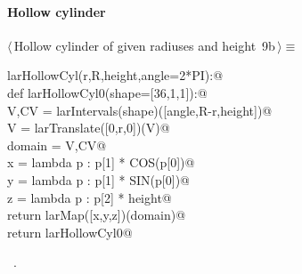 \documentclass[11pt,oneside]{article}	%
\begin{document}
\paragraph{Hollow cylinder}
\begin{flushleft} \small \label{scrap18}
\protect{}$\langle\,$Hollow cylinder of given radiuses and height\nobreak\ {\footnotesize 9b}$\,\rangle\equiv$
\vspace{-1ex}
\begin{list}{}{} \item
\mbox{}\verb@def larHollowCyl(r,R,height,angle=2*PI):@\\
\mbox{}\verb@   def larHollowCyl0(shape=[36,1,1]):@\\
\mbox{}\verb@      V,CV = larIntervals(shape)([angle,R-r,height])@\\
\mbox{}\verb@      V = larTranslate([0,r,0])(V)@\\
\mbox{}\verb@      domain = V,CV@\\
\mbox{}\verb@      x = lambda p : p[1] * COS(p[0])@\\
\mbox{}\verb@      y = lambda p : p[1] * SIN(p[0])@\\
\mbox{}\verb@      z = lambda p : p[2] * height@\\
\mbox{}\verb@      return larMap([x,y,z])(domain)@\\
\mbox{}\verb@   return larHollowCyl0@\\
\mbox{}\verb@@{\NWsep}
\end{list}
\vspace{-1ex}
\footnotesize\addtolength{\baselineskip}{-1ex}
\begin{list}{}{\setlength{\itemsep}{-\parsep}\setlength{\itemindent}{-\leftmargin}}
\item \NWtxtMacroRefIn\ .
\end{list}
\end{flushleft}
\end{document}
